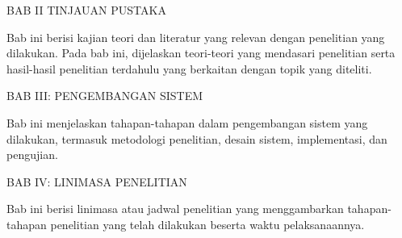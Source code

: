 BAB II TINJAUAN PUSTAKA

Bab ini berisi kajian teori dan literatur yang relevan dengan penelitian yang dilakukan. Pada bab ini, dijelaskan teori-teori yang mendasari penelitian serta hasil-hasil penelitian terdahulu yang berkaitan dengan topik yang diteliti.

BAB III: PENGEMBANGAN SISTEM

Bab ini menjelaskan tahapan-tahapan dalam pengembangan sistem yang dilakukan, termasuk metodologi penelitian, desain sistem, implementasi, dan pengujian.

BAB IV: LINIMASA PENELITIAN

Bab ini berisi linimasa atau jadwal penelitian yang menggambarkan tahapan-tahapan penelitian yang telah dilakukan beserta waktu pelaksanaannya.
